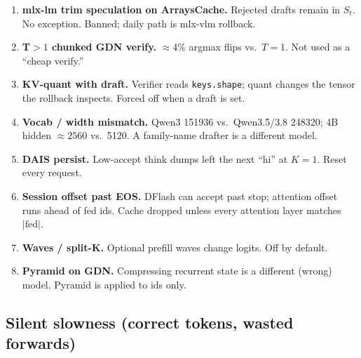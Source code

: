 \begin{enumerate}[leftmargin=1.4em]
\item \textbf{mlx-lm trim speculation on ArraysCache.} Rejected drafts remain in $S_t$. No exception. Banned; daily path is mlx-vlm rollback.
\item \textbf{T${>}1$ chunked GDN verify.} $\approx 4\%$ argmax flips vs.\ $T{=}1$. Not used as a ``cheap verify.''
\item \textbf{KV-quant with draft.} Verifier reads \texttt{keys.shape}; quant changes the tensor the rollback inspects. Forced off when a draft is set.
\item \textbf{Vocab / width mismatch.} Qwen3 151936 vs.\ Qwen3.5/3.8 248320; 4B hidden $\approx 2560$ vs.\ 5120. A family-name drafter is a different model.
\item \textbf{DAIS persist.} Low-accept think dumps left the next ``hi'' at $K{=}1$. Reset every request.
\item \textbf{Session offset past EOS.} DFlash can accept past stop; attention offset runs ahead of fed ids. Cache dropped unless every attention layer matches $|\mathrm{fed}|$.
\item \textbf{Waves / split-K.} Optional prefill waves change logits. Off by default.
\item \textbf{Pyramid on GDN.} Compressing recurrent state is a different (wrong) model. Pyramid is applied to ids only.
\end{enumerate}

\subsection{Silent slowness (correct tokens, wasted forwards)}

